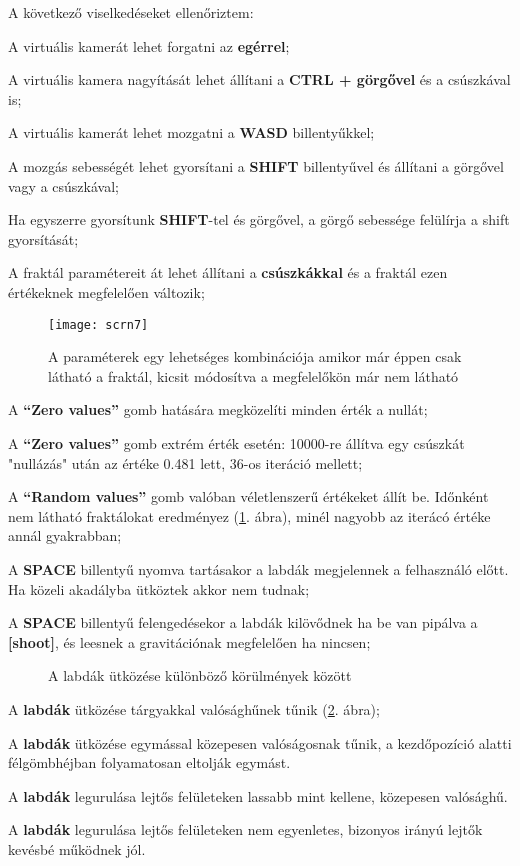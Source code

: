 A következő viselkedéseket ellenőriztem:
\begin{compactenum}
	\item A virtuális kamerát lehet forgatni az \textbf{egérrel};
	\item A virtuális kamera nagyítását lehet állítani a \textbf{CTRL + görgővel} és a csúszkával is;
	\item A virtuális kamerát lehet mozgatni a \textbf{WASD} billentyűkkel;
	\item A mozgás sebességét lehet gyorsítani a \textbf{SHIFT} billentyűvel és állítani a görgővel vagy a csúszkával;
	\item Ha egyszerre gyorsítunk \textbf{SHIFT}-tel és görgővel, a görgő sebessége felülírja a shift gyorsítását;
	\item A fraktál paramétereit át lehet állítani a \textbf{csúszkákkal} és a fraktál ezen értékeknek megfelelően változik;
	\begin{figure}[H]
	\centering
	\texttt{[image: scrn7]}
	\caption{A paraméterek egy lehetséges kombinációja amikor már éppen csak látható a fraktál, kicsit módosítva a megfelelőkön már nem látható}
	\label{fig:extr}
    \end{figure}
	\item A \textbf{``Zero values''} gomb hatására megközelíti minden érték a nullát;
	\item A \textbf{``Zero values''} gomb extrém érték esetén: 10000-re állítva egy csúszkát "nullázás" után az értéke 0.481 lett, 36-os iteráció mellett;
	\item A \textbf{``Random values''} gomb valóban véletlenszerű értékeket állít be. Időnként nem látható fraktálokat eredményez (\ref{fig:extr}. ábra), minél nagyobb az iterácó értéke annál gyakrabban;
	\item A \textbf{SPACE} billentyű nyomva tartásakor a labdák megjelennek a felhasználó előtt. Ha közeli akadályba ütköztek akkor nem tudnak;
	\item A \textbf{SPACE} billentyű felengedésekor a labdák kilövődnek ha be van pipálva a \textbf{[shoot]}, és leesnek a gravitációnak megfelelően ha nincsen;
\begin{figure}[H]
	\centering
	\hspace{1pt}
	\caption{A labdák ütközése különböző körülmények között}
	\label{fig:hit}
\end{figure}
	\item A \textbf{labdák} ütközése tárgyakkal valósághűnek tűnik (\ref{fig:hit}. ábra);
	\item A \textbf{labdák} ütközése egymással közepesen valóságosnak tűnik, a kezdőpozíció alatti félgömbhéjban folyamatosan eltolják egymást.
	\item A \textbf{labdák} legurulása lejtős felületeken lassabb mint kellene, közepesen valósághű.
	\item A \textbf{labdák} legurulása lejtős felületeken nem egyenletes, bizonyos irányú lejtők kevésbé működnek jól.
\end{compactenum}



